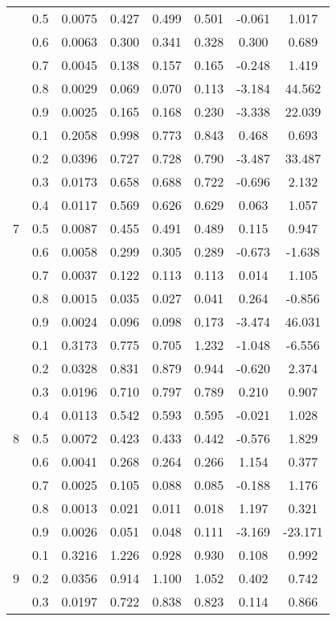 \documentclass[11pt,a4paper]{report}
\begin{document}
\begin{longtable}{ | c | c || c | c | c | c | c | c | }
 & 0.5 & 0.0075 & 0.427 & 0.499 & 0.501 & -0.061 & 1.017 \\
 & 0.6 & 0.0063 & 0.300 & 0.341 & 0.328 & 0.300 & 0.689 \\
 & 0.7 & 0.0045 & 0.138 & 0.157 & 0.165 & -0.248 & 1.419 \\
 & 0.8 & 0.0029 & 0.069 & 0.070 & 0.113 & -3.184 & 44.562 \\
 & 0.9 & 0.0025 & 0.165 & 0.168 & 0.230 & -3.338 & 22.039 \\
 \hline
\multirow{9}{*}{7} & 0.1 & 0.2058 & 0.998 & 0.773 & 0.843 & 0.468 & 0.693 \\
 & 0.2 & 0.0396 & 0.727 & 0.728 & 0.790 & -3.487 & 33.487 \\
 & 0.3 & 0.0173 & 0.658 & 0.688 & 0.722 & -0.696 & 2.132 \\
 & 0.4 & 0.0117 & 0.569 & 0.626 & 0.629 & 0.063 & 1.057 \\
 & 0.5 & 0.0087 & 0.455 & 0.491 & 0.489 & 0.115 & 0.947 \\
 & 0.6 & 0.0058 & 0.299 & 0.305 & 0.289 & -0.673 & -1.638 \\
 & 0.7 & 0.0037 & 0.122 & 0.113 & 0.113 & 0.014 & 1.105 \\
 & 0.8 & 0.0015 & 0.035 & 0.027 & 0.041 & 0.264 & -0.856 \\
 & 0.9 & 0.0024 & 0.096 & 0.098 & 0.173 & -3.474 & 46.031 \\
 \hline
\multirow{9}{*}{8} & 0.1 & 0.3173 & 0.775 & 0.705 & 1.232 & -1.048 & -6.556 \\
 & 0.2 & 0.0328 & 0.831 & 0.879 & 0.944 & -0.620 & 2.374 \\
 & 0.3 & 0.0196 & 0.710 & 0.797 & 0.789 & 0.210 & 0.907 \\
 & 0.4 & 0.0113 & 0.542 & 0.593 & 0.595 & -0.021 & 1.028 \\
 & 0.5 & 0.0072 & 0.423 & 0.433 & 0.442 & -0.576 & 1.829 \\
 & 0.6 & 0.0041 & 0.268 & 0.264 & 0.266 & 1.154 & 0.377 \\
 & 0.7 & 0.0025 & 0.105 & 0.088 & 0.085 & -0.188 & 1.176 \\
 & 0.8 & 0.0013 & 0.021 & 0.011 & 0.018 & 1.197 & 0.321 \\
 & 0.9 & 0.0026 & 0.051 & 0.048 & 0.111 & -3.169 & -23.171 \\
 \hline
\multirow{9}{*}{9} & 0.1 & 0.3216 & 1.226 & 0.928 & 0.930 & 0.108 & 0.992 \\
 & 0.2 & 0.0356 & 0.914 & 1.100 & 1.052 & 0.402 & 0.742 \\
 & 0.3 & 0.0197 & 0.722 & 0.838 & 0.823 & 0.114 & 0.866 \\

\end{longtable}
\end{document}
